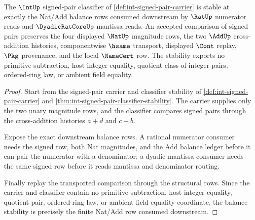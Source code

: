 \begin{theorem}
\label{thm:int-signed-pair-balance-stability}
The $\IntUp$ signed-pair classifier of
\autoref{def:int-signed-pair-carrier} is stable at exactly the Nat/Add balance
rows consumed downstream by $\RatUp$ numerator reads and $\DyadicRatCoreUp$
mantissa reads. An accepted comparison of signed pairs preserves the four
displayed $\NatUp$ magnitude rows, the two $\AddUp$ cross-addition histories,
componentwise $\hsame$ transport, displayed $\Cont$ replay, $\Pkg$ provenance,
and the local $\NameCert$ row. The stability exports no primitive subtraction,
host integer equality, quotient class of integer pairs, ordered-ring law, or
ambient field equality.
\end{theorem}
\begin{proof}
Start from the signed-pair carrier and classifier stability of
\autoref{def:int-signed-pair-carrier} and
\autoref{thm:int-signed-pair-classifier-stability}. The carrier supplies only
the two unary magnitude rows, and the classifier compares signed pairs through
the cross-addition histories $a+d$ and $c+b$.

Expose the exact downstream balance rows. A rational numerator consumer needs
the signed row, both Nat magnitudes, and the Add balance ledger before it can
pair the numerator with a denominator; a dyadic mantissa consumer needs the
same signed row before it reads mantissa and denominator routing.

Finally replay the transported comparison through the structural rows. Since
the carrier and classifier contain no primitive subtraction, host integer
equality, quotient pair, ordered-ring law, or ambient field-equality coordinate,
the balance stability is precisely the finite Nat/Add row consumed downstream.
\end{proof}

